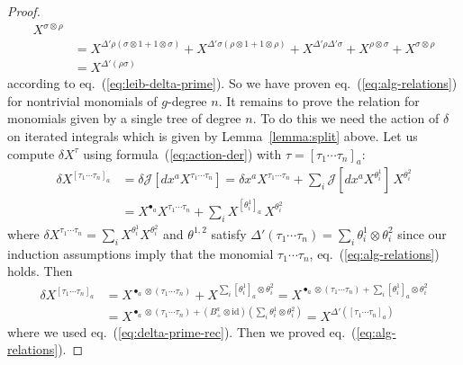 \documentclass[a4paper,11pt,reqno]{article}
\newcommand{\1}{{\bf 1}}
\newcommand{\der}{\delta}
\newcommand{\cj}{\mathcal J}
\newcommand{\troot}{\bullet}
\begin{document}
\begin{proof}
\begin{equation*}
\begin{split}
X^{\sigma \otimes \rho}
\\& =   
X^{\Delta' \rho( \sigma\otimes 1 + 1 \otimes \sigma)} +
X^{\Delta'\sigma (\rho\otimes 1 + 1 \otimes \rho)} +
X^{\Delta'\rho \Delta'\sigma} + X^{\rho \otimes \sigma} +
X^{\sigma \otimes \rho}
\\ & = X^{\Delta'(\rho \sigma) }
  \end{split}
\end{equation*}
according to eq.~(\ref{eq:leib-delta-prime}).
So we have proven eq.~(\ref{eq:alg-relations}) for nontrivial monomials
of $g$-degree $n$. It remains to prove the relation for monomials
given by a single tree of degree $n$. To do this we need the action of
$\der$ on iterated integrals which is given by Lemma~\ref{lemma:split} above.
Let us compute $\der X^\tau$ using formula~(\ref{eq:action-der})
with $\tau = [\tau_1 \cdots \tau_n]_a$:
\begin{equation*}
  \begin{split}
\der X^{[\tau_1 \cdots \tau_n]_a} & = \der \cj[ dx^a X^{\tau_1 \cdots \tau_n}]
=  \der x^a   X^{\tau_1 \cdots \tau_n} + \sum_i \cj[dx^a X^{\theta^1_i}]\, X^{\theta^2_i}
\\ & =    X^{\troot_a} X^{\tau_1 \cdots \tau_n} + \sum_i X^{[\theta^1_i]_a}\, X^{\theta^2_i}
  \end{split}
\end{equation*}
where $\der X^{\tau_1 \cdots \tau_n} = \sum_i X^{\theta^1_i}
X^{\theta^2_i}$ and $\theta^{1,2}$ satisfy
$
\Delta'(\tau_1 \cdots \tau_n) = \sum_i \theta^1_i \otimes \theta^2_i
$
since our induction assumptions imply that the monomial $\tau_1 \cdots \tau_n$,
eq.~(\ref{eq:alg-relations}) holds. 
Then
\begin{equation*}
  \begin{split}
\der X^{[\tau_1 \cdots \tau_n]_a}
 & =    X^{\troot_a \otimes  (\tau_1 \cdots \tau_n)} +
 X^{\sum_i [\theta^1_i]_a \otimes \theta^2_i}
=    X^{\troot_a \otimes  (\tau_1 \cdots \tau_n) +
 \sum_i [\theta^1_i]_a \otimes \theta^2_i}
\\ & =    X^{\troot_a \otimes  (\tau_1 \cdots \tau_n) +
  (B_+^a \otimes \text{id})(\sum_i \theta^1_i \otimes \theta^2_i)}
=    X^{\Delta'([\tau_1 \cdots \tau_n]_a)}
  \end{split}
\end{equation*}
where we used eq.~(\ref{eq:delta-prime-rec}). Then we proved eq.~(\ref{eq:alg-relations}).
\end{proof}
\end{document}
